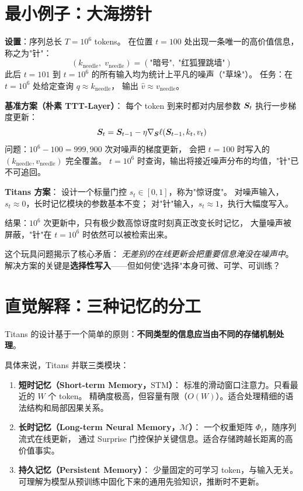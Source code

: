 \section{最小例子：大海捞针}
\label{sec:titans_minimal}

\begin{toybox}[title=玩具问题 F：百万 Token 草垛寻针（Needle in A Haystack）]
\textbf{设置}：序列总长 $T = 10^6$ tokens。
在位置 $t = 100$ 处出现一条唯一的高价值信息，称之为"针"：
\[
  (k_{\text{needle}},\; v_{\text{needle}}) = (\text{"暗号"},\; \text{"红狐狸跳墙"})
\]
此后 $t = 101$ 到 $t = 10^6$ 的所有输入均为统计上平凡的噪声（"草垛"）。
任务：在 $t = 10^6$ 处给定查询 $q \approx k_{\text{needle}}$，
输出 $\hat{v} \approx v_{\text{needle}}$。

\textbf{基准方案（朴素 TTT-Layer）}：
每个 token 到来时都对内层参数 $\boldsymbol{S}_t$ 执行一步梯度更新：
\[
  \boldsymbol{S}_t = \boldsymbol{S}_{t-1} - \eta \nabla_{\boldsymbol{S}} \ell(\boldsymbol{S}_{t-1}, k_t, v_t)
\]
问题：$10^6 - 100 = 999{,}900$ 次对噪声的梯度更新，
会把 $t=100$ 时写入的 $(k_{\text{needle}}, v_{\text{needle}})$ 完全覆盖。
$t = 10^6$ 时查询，输出将接近噪声分布的均值，"针"已不可追回。

\textbf{Titans 方案}：
设计一个标量门控 $s_t \in [0, 1]$，称为"惊讶度"。
对噪声输入，$s_t \approx 0$，长时记忆模块的参数基本不变；
对"针"输入，$s_t \approx 1$，执行大幅度写入。

结果：$10^6$ 次更新中，只有极少数高惊讶度时刻真正改变长时记忆，
大量噪声被屏蔽，"针"在 $t = 10^6$ 时依然可以被检索出来。
\end{toybox}

这个玩具问题揭示了核心矛盾：
\textit{无差别的在线更新会把重要信息淹没在噪声中}。
解决方案的关键是\textbf{选择性写入}——但如何使"选择"本身可微、可学、可训练？

\section{直觉解释：三种记忆的分工}
\label{sec:titans_intuition}

Titans 的设计基于一个简单的原则：\textbf{不同类型的信息应当由不同的存储机制处理}。

具体来说，Titans 并联三类模块：

\begin{enumerate}
  \item \textbf{短时记忆（Short-term Memory，$\text{STM}$）}：
    标准的滑动窗口注意力。只看最近的 $W$ 个 token。
    精确度极高，但容量有限（$O(W)$）。适合处理精细的语法结构和局部因果关系。

  \item \textbf{长时记忆（Long-term Neural Memory，$\mathcal{M}$）}：
    一个权重矩阵 $\Phi_t$，随序列流式在线更新，
    通过 Surprise 门控保护关键信息。适合存储跨越长距离的高价值事实。

  \item \textbf{持久记忆（Persistent Memory）}：
    少量固定的可学习 token，与输入无关。
    可理解为模型从预训练中固化下来的通用先验知识，推断时不更新。
\end{enumerate}

